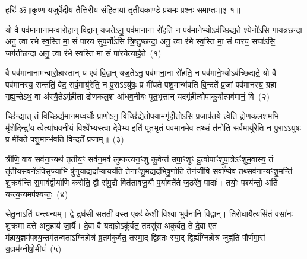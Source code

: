 {\anuvakamend[{वी॒र इषꣳ॑ ह॒व्यमु॒षसो॑ मरुतश्च॒ वृष्टिं॒ भग॑स्य॒ द्वाद॑श च}]}%

{हरिः॑ ॐ}{॥कृष्ण-यजुर्वेदीय-तैत्तिरीय-संहितायां तृतीयकाण्डे प्रथमः प्रश्नः समाप्तः॥३-१॥}



\setcounter{anuvakam}{0}
यो वै पव॑मानानामन्वारो॒हान् वि॒द्वान् यज॒ते\-ऽनु॒ पव॑माना॒ना रो॑हति॒ न पव॑माने॒भ्यो\-ऽव॑च्छिद्यते श्ये॒नो॑\-ऽसि गाय॒त्रछ॑न्दा॒ अनु॒ त्वा र॑भे स्व॒स्ति मा॒ सं पा॑रय सुप॒र्णो॑\-ऽसि त्रि॒ष्टुप्छ॑न्दा॒ अनु॒ त्वा र॑भे स्व॒स्ति मा॒ सं पा॑रय॒ सघा॑ऽसि॒ जग॑तीछन्दा॒ अनु॒ त्वा र॑भे स्व॒स्ति मा॒ सं पा॑र॒येत्या॑है॒ते~(१)\ip

वै पव॑मानानामन्वारो॒हास्तान् य ए॒वं वि॒द्वान् यज॒ते\-ऽनु॒ पव॑माना॒ना रो॑हति॒ न पव॑माने॒भ्यो\-ऽव॑च्छिद्यते॒ यो वै पव॑मानस्य॒ सन्त॑तिं॒ वेद॒ सर्व॒मायु॑रेति॒ न पु॒रा\-ऽऽ\-यु॑षः॒ प्र मी॑यते पशु॒मान्भ॑वति वि॒न्दते᳚ प्र॒जां पव॑मानस्य॒ ग्रहा॑ गृह्य॒न्ते\-ऽथ॒ वा अ॑स्यै॒ते\-ऽगृ॑हीता द्रोणकल॒श आ॑धव॒नीयः॑ पूत॒भृत्तान् यदगृ॑हीत्वोपाकु॒र्यात्पव॑मानं॒ वि~(२)\ip

च्छि॑न्द्या॒त् तं वि॒च्छिद्य॑मानमध्व॒र्योः प्रा॒णो\-ऽनु॒ विच्छि॑द्येतोप\-या॒मगृ॑हीतो\-ऽसि प्र॒जा\-प॑तये॒ त्वेति॑ द्रोणकल॒शम॒भि मृ॑शे॒दिन्द्रा॑य॒ त्वेत्या॑धव॒नीयं॒ विश्वे᳚भ्यस्त्वा दे॒वेभ्य॒ इति॑ पूत॒भृतं॒ पव॑मानमे॒व तथ्सं त॑नोति॒ सर्व॒मायु॑रेति॒ न पु॒रा\-ऽऽ\-यु॑षः॒ प्र मी॑यते पशु॒मान्भ॑वति वि॒न्दते᳚ प्र॒जाम्॥~(३)\ip

{\anuvakamend[{ए॒ते वि द्विच॑त्वारिꣳशच्च}]}

त्रीणि॒ वाव सव॑ना॒न्यथ॑ तृ॒तीय॒ꣳ॒ सव॑न॒मव॑ लुम्पन्त्यन॒ꣳ॒शु कु॒र्वन्त॑ उपा॒ꣳ॒शुꣳ हु॒त्वोपाꣳ॑शुपा॒त्रे\-ऽꣳ॑शुम॒वास्य॒ तं तृ॑तीय\-सव॒ने॑\-ऽपि॒सृज्या॒भि षु॑णुया॒द्यदा᳚प्या॒यय॑ति॒ तेनाꣳ॑शु॒मद्यद॑भिषु॒णोति॒ तेन॑र्जी॒षि सर्वा᳚ण्ये॒व तथ्सव॑नान्यꣳशु॒मन्ति॑ शु॒क्रव॑न्ति स॒माव॑द्वीर्याणि करोति॒ द्वौ स॑मु॒द्रौ वित॑तावजू॒र्यौ प॒र्याव॑र्तेते ज॒ठरे॑व॒ पादाः᳚। तयोः॒ पश्य॑न्तो॒ अति॑ यन्त्य॒न्यमप॑श्यन्तः॒~(४)\ip

सेतु॒ना\-ऽति॑ यन्त्य॒न्यम्। द्वे द्रध॑सी स॒तती॑ वस्त॒ एकः॑ के॒शी विश्वा॒ भुव॑नानि वि॒द्वान्। ति॒रो॒धायै॒त्यसि॑तं॒ वसा॑नः शु॒क्रमा द॑त्ते अनु॒हाय॑ जा॒र्यै। दे॒वा वै यद्य॒ज्ञे\-ऽकु॑र्वत॒ तदसु॑रा अकुर्वत॒ ते दे॒वा ए॒तं म॑हाय॒ज्ञम॑पश्य॒न्तम॑तन्वता\-ऽ\-ग्निहो॒त्रं व्र॒तम॑कुर्वत॒ तस्मा॒द् द्विव्र॑तः स्या॒द् द्विर्\mbox{}ह्य॑ग्निहो॒त्रं जुह्व॑ति पौर्णमा॒सं य॒ज्ञम॑ग्नीषो॒मीयं॑~(५)\ip

